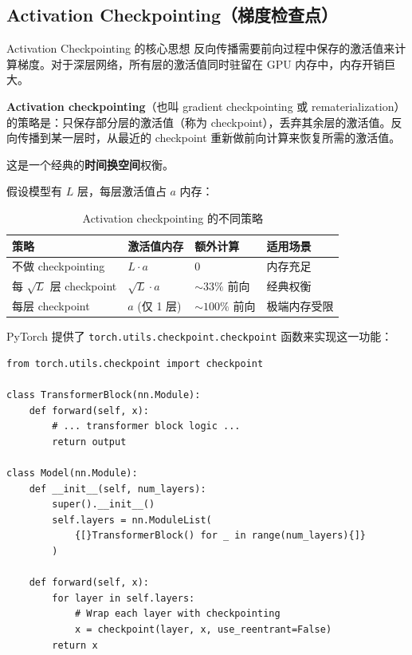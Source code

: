 \subsection{Activation Checkpointing（梯度检查点）}

\begin{importantbox}{Activation Checkpointing 的核心思想}
反向传播需要前向过程中保存的激活值来计算梯度。对于深层网络，所有层的激活值同时驻留在 GPU 内存中，内存开销巨大。

\textbf{Activation checkpointing}（也叫 gradient checkpointing 或 rematerialization）的策略是：只保存部分层的激活值（称为 checkpoint），丢弃其余层的激活值。反向传播到某一层时，从最近的 checkpoint 重新做前向计算来恢复所需的激活值。

这是一个经典的\textbf{时间换空间}权衡。
\end{importantbox}

假设模型有 $L$ 层，每层激活值占 $a$ 内存：

\begin{table}[H]
\centering
\begin{tabular}{p{}p{}p{}p{}}
\toprule
\textbf{策略} & \textbf{激活值内存} & \textbf{额外计算} & \textbf{适用场景} \\
\midrule
不做 checkpointing & $L \cdot a$ & 0 & 内存充足 \\
每 $\sqrt{L}$ 层 checkpoint & $\sqrt{L} \cdot a$ & $\sim 33\%$ 前向 & 经典权衡 \\
每层 checkpoint & $a$ (仅 1 层) & $\sim 100\%$ 前向 & 极端内存受限 \\
\bottomrule
\end{tabular}
\caption{Activation checkpointing 的不同策略}
\end{table}

PyTorch 提供了 \texttt{torch.utils.checkpoint.checkpoint} 函数来实现这一功能：

\begin{lstlisting}[caption={使用 activation checkpointing 的示例}]
from torch.utils.checkpoint import checkpoint

class TransformerBlock(nn.Module):
    def forward(self, x):
        # ... transformer block logic ...
        return output

class Model(nn.Module):
    def __init__(self, num_layers):
        super().__init__()
        self.layers = nn.ModuleList(
            {[}TransformerBlock() for _ in range(num_layers){]}
        )

    def forward(self, x):
        for layer in self.layers:
            # Wrap each layer with checkpointing
            x = checkpoint(layer, x, use_reentrant=False)
        return x
\end{lstlisting}

